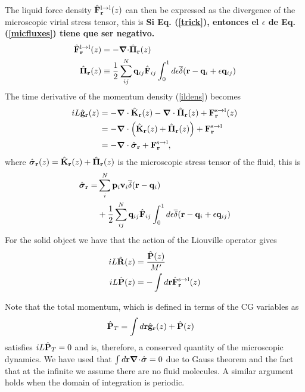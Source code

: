 \documentclass[b5paper,openright,11pt]{book}
\newcommand{\esc}{\!\cdot\!}
\newcommand{\Note}[1]{{\bf \color{red}#1}}    %
\begin{document}
The liquid  force density  $\hat{\bf F}^{\rm  l\to l}_{\bf  r}(z)$ can
then be expressed  as the divergence of the  microscopic virial stress
tensor, this is
\Note{Si Eq. (\ref{trick}), entonces el $\epsilon$ de Eq. (\ref{micfluxes}) tiene que ser negativo.}
\begin{align}
\hat{\bf F}^{\rm l\to l}_{\bf r}(z)&=-\boldsymbol{\nabla}{\cdot} \hat{\boldsymbol{\Pi}}_{\bf r}(z)
\nonumber\\
\hat{\boldsymbol{\Pi}}_{\bf r}(z)&\equiv \frac{1}{2}\sum^{N}_{ij}{\bf q}_{ij}\hat{\bf F}_{ij}
\int_0^{1}d\epsilon \overline\delta({\bf r}-{\bf q}_i+\epsilon{\bf q}_{ij})
\label{micfluxes}
\end{align}
The time derivative of the momentum density (\ref{ildens}) becomes
\begin{align}
    iL\hat{\bf g}_{\bf r}(z)
    &=-\boldsymbol{\nabla}\cdot \hat{{\bf K}}_{\bf r}(z) - \boldsymbol{\nabla}\cdot \hat{{\bf     \Pi}}_{\bf r}(z) +  {\bf F}^{\rm s\to l}_{\bf r}(z) \nonumber \\
    &= -\boldsymbol{\nabla}\cdot\left(\hat{{\bf K}}_{\bf r}(z)+\hat{{\bf \Pi}}_{\bf r}(z)\right) +{\bf F}^{\rm s\to l}_{\bf r} \nonumber \\
    &=-\boldsymbol{\nabla}\cdot \hat{\boldsymbol{\sigma}}_{\bf r}+{\bf F}^{\rm s\to l}_{\bf r},
\label{gls}
\end{align}
where     $\hat{\boldsymbol{\sigma}}_{\bf r}(z)=\hat{{\bf K}}_{\bf
r}(z)+\hat{\boldsymbol{\Pi}}_{\bf r}(z)$  is the microscopic stress
tensor of the fluid, this is
\begin{align}
  \hat{\boldsymbol{\sigma}}_{\bf r}=&
\sum^{N}_i{\bf p}_i{\bf v}_i
\overline\delta({\bf r}-{\bf q}_i)\nonumber\\
&+
\frac{1}{2}\sum^{N}_{ij}{\bf q}_{ij}\hat{\bf F}_{ij}
\int_0^{1}d\epsilon \overline\delta({\bf r}-{\bf q}_i+\epsilon{\bf q}_{ij})
\label{sigma}
\end{align}
For the solid object we have that the action of the Liouville operator gives
\begin{align}
    iL\hat{\bf R}(z) &=\frac{\hat{\bf P}(z)}{M'}
  \nonumber\\
    iL\hat{\bf P}(z) &=-\int  d{\bf r} \hat{\bf F}^{\rm s\to l}_{\bf r}(z)
   \label{Pfsl}  
\end{align} 

Note  that the  total  momentum,  which is  defined  in  terms of  the
CG variables as
\begin{align}
  \hat{\bf P}_T&=\int d{\bf r} \hat{\bf g}_{\bf r}(z)+\hat{\bf P}(z)
\end{align}
satisfies $ iL\hat{\bf P}_T=0$ and is, therefore, a conserved quantity
of  the  microscopic   dynamics.   We  have  used   that  $\int  d{\bf
r}\boldsymbol{\nabla}\esc\hat{\boldsymbol{\sigma}}=0$ due to  Gauss theorem  and the  fact
that at the infinite we assume there are no fluid molecules. A similar
argument holds when the domain of integration is periodic.
\end{document}
